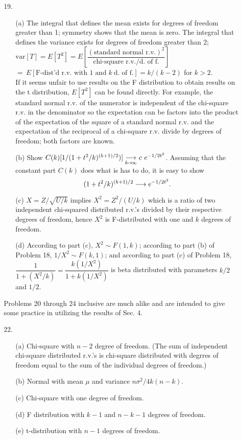 \begin{enumerate}
	\newpage
	\item[19.]  \begin{enumerate}
		\item[(a)] The integral that defines the mean exists for degrees of freedom greater than 1; symmetry shows that the mean is zero. The integral that defines the variance exists for degrees of freedom greater than 2; \\
		$\mbox{var}[T] = E[T^2] = E[\dfrac{(\mbox{standard normal r.v.})^2}{\mbox{chi-square r.v./d.\ of f.}}]$ \\
		$=\ E[\mbox{F-dist'd r.v.\ with 1 and }k\ \mbox{d.\ of f.}] = k/(k-2)$ for $k>2$.	\\
		If it seems unfair to use results on the F distribution to obtain results on the t distribution, $E[T^2]$ can be found directly. For example, the standard normal r.v. of the numerator is independent of the chi-square r.v. in the denominator so the expectation can be factors into the product of the expectation of the square of a standard normal r.v. and the expectation of the reciprocal of a chi-square r.v. divide by degrees of freedom; both factors are known.
		\item[(b)] Show $C(k)[1/(1+t^2/k)^{(k+1)/2})] \underset {\tiny {k\! \to\! \infty}}{ \longrightarrow} c\ e^{-{\small 1/2}t^2}$.
		Assuming that the constant part $C(k)$ does what is has to do, it is easy to show 
		\[(1 + t^2/k)^{(k+1)/2} \longrightarrow e^{-{\small 1/2}t^2}. \]
		\item[(c)] $X =Z/\sqrt{U/k}$ implies $X^2=Z^2/(U/k)$ which is a ratio of two independent chi-squared distributed r.v.'s divided by their respective degrees of freedom, hence $X^2$ is F-distributed with one and $k$ degrees of freedom.
		\item[(d)] According to part (c), $X^2\sim F(1,k)$; according to part (b) of Problem 18, $1/X^2\sim F(k,1)$; and according to part (c) of Problem 18, $\dfrac{1}{1+(X^2/k)} = \dfrac{k(1/X^2)}{1+k(1/X^2)}$ is beta distributed with parameters $k/2$ and $1/2$.
	\end{enumerate}

Problems 20 through 24 inclusive are much alike and are intended to give some practice in utilizing the results of Sec. 4.
	\item[22.] \begin{enumerate}
		\item[(a)] Chi-square with $n-2$ degree of freedom. (The sum of independent chi-square distributed r.v.'s is chi-square distributed with degrres of freedom equal to the sum of the individual degrees of freedom.)	
		\item[(b)] Normal with mean $\mu$ and variance $n\sigma^2/4k(n-k)$.
		\item[(c)] Chi-square with one degree of freedom.
		\item[(d)] F distribution with $k-1$ and $n-k-1$ degrees of freedom.
		\item[(e)] t-distribution with $n-1$ degrees of freedom.
	\end{enumerate}


\end{enumerate}
